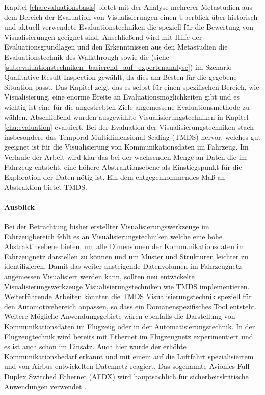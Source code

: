 \documentclass[draft=false
              ,paper=a4
              ,twoside=false
              ,fontsize=11pt
              ,headsepline
              ,BCOR10mm
              ,DIV11
              ]{scrbook}
\begin{document}
Kapitel \ref{cha:evaluationsbasis} bietet mit der Analyse mehrerer Metastudien aus dem Bereich der Evaluation von Visualisierungen einen Überblick über historisch und aktuell verwendete Evaluationstechniken die speziell für die Bewertung von Visualisierungen geeignet sind. Anschließend wird mit Hilfe der Evaluationsgrundlagen und den Erkenntnissen aus den Metastudien die Evaluationstechnik des Walkthrough sowie die  (siehe \ref{sub:evaluationstechniken_basierend_auf_expertenanalyse}) im Szenario Qualitative Result Inspection gewählt, da dies am Besten für die gegebene Situation passt. Das Kapitel zeigt das es selbst für einen spezifischen Bereich, wie Visualisierung, eine enorme Breite an Evaluationsmöglichkeiten gibt und es wichtig ist eine für die angestrebten Ziele angemessene Evaluationsmethode zu wählen. 
Abschließend wurden ausgewählte Visualisierungstechniken in Kapitel \ref{cha:evaluation} evaluiert. Bei der Evaluation der Visualisierungstechniken stach insbesondere das Temporal Multidimensional Scaling (TMDS) hervor, welches gut geeignet ist für die Visualisierung von Kommunikationsdaten im Fahrzeug. Im Verlaufe der Arbeit wird klar das bei der wachsenden Menge an Daten die im Fahrzeug entsteht, eine höhere Abstraktionsebene als Einstiegspunkt für die Exploration der Daten nötig ist. Ein dem entgegenkommendes Maß an Abstraktion bietet TMDS. 

\paragraph{Ausblick} %
\label{par:ausblick}
Bei der Betrachtung bisher erstellter Visualisierungswerkzeuge im Fahrzeugbereich fehlt es an Visualisierungstechniken welche eine hohe Abstraktinsebene bieten, um alle Dimensionen der Kommunikationsdaten im Fahrzeugnetz darstellen zu können und um Muster und Strukturen leichter zu identifizieren. Damit das weiter ansteigende Datenvolumen im Fahrzeugnetz angemessen Visualisiert werden kann, sollten neu entwickelte Visualisierungswerkzeuge Visualisierungstechniken wie TMDS implementieren.
Weiterführende Arbeiten könnten die TMDS Visualisierungstechnik speziell für den Automotivebereich anpassen, so dass ein Domänenspezifisches Tool entsteht. Weitere Mögliche Anwendungsgebiete wären ebenfalls die Darstellung von Kommunikationsdaten im Flugzeug oder in der Automatisierungstechnik.  In der Flugzeugtechnik wird bereits mit Ethernet im Flugzeugnetz experimentiert und es ist auch schon im Einsatz. Auch hier wurde der erhöhte Kommunikationsbedarf erkannt und mit einem auf die Luftfahrt spezialisiertem und von Airbus entwickelten Datennetz reagiert. Das sogenannte Avionics Full-Duplex Switched Ethernet (AFDX) wird hauptsächlich für sicherheitskritische Anwendungen verwendet \cite{steiner_recent_2014}. 
\end{document}
